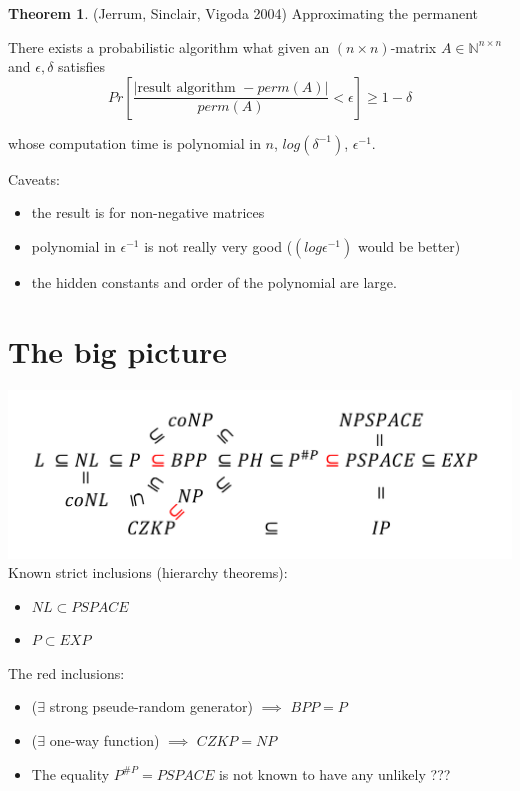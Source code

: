 \documentclass[a4paper,12pt]{article}
\theoremstyle{definition}
\newtheorem{theorem}[counter]{Theorem}
\theoremstyle{remark}
\newcommand{\N}{\mathbb{N}}
\begin{document}
\begin{theorem}
    (Jerrum, Sinclair, Vigoda 2004) Approximating the permanent

    There exists a probabilistic algorithm what given an $(n \times n)$-matrix $A \in \N^{n \times n}$ 
    and $\epsilon, \delta$ satisfies 
    \begin{equation*}
        Pr [\frac{|\text{result algorithm } - perm(A)|}{perm(A)} < \epsilon] \geq 1 - \delta
    \end{equation*}

    whose computation time is polynomial in $n$, $log(\delta^{-1})$, $\epsilon^{-1}$.

    Caveats:
    \begin{itemize}
        \item the result is for non-negative matrices
        \item polynomial in $\epsilon^{-1}$ is not really very good ($(log \epsilon^{-1})$ would be better)
        \item the hidden constants and order of the polynomial are large.
    \end{itemize}
\end{theorem}


\newpage
\section{The big picture}
\includegraphics[width=\textwidth]{img/TheBigPicture.png}
Known strict inclusions (hierarchy theorems):
\begin{itemize}
    \item $NL \subset PSPACE$
    \item $P \subset EXP$
\end{itemize}
The red inclusions:
\begin{itemize}
    \item ($\exists$ strong pseude-random generator) $\implies$ $BPP = P$
    \item ($\exists$ one-way function) $\implies$ $CZKP = NP$
    \item The equality $P^{\#P} = PSPACE$ is not known to have any unlikely ???
\end{itemize}
\end{document}
